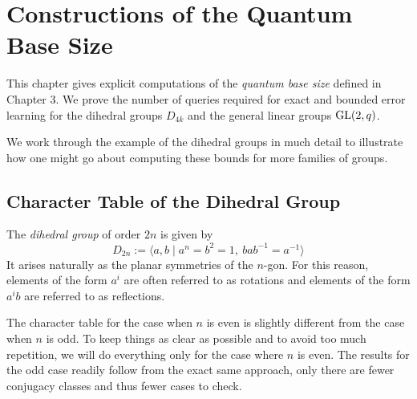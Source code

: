 

\chapter{Constructions of the Quantum Base Size}

This chapter gives explicit computations of the \emph{quantum base size} defined in Chapter 3. We prove the number 
of queries required for exact and bounded error learning for the dihedral groups $D_{4k}$ and the general linear 
groups $\operatorname{GL}(2, q)$.

We work through the example of the dihedral groups in much detail to illustrate how one might go about computing 
these bounds for more families of groups.





\section{Character Table of the Dihedral Group}

The \emph{dihedral group} of order $2n$ is given by
\[
    D_{2n} := \langle a,b \mid a^n = b^2 = 1,\ bab^{-1} = a^{-1} \rangle
\]
It arises naturally as the planar symmetries of the $n$-gon. For this reason, elements of the form $a^i$ are often 
referred to as rotations and elements of the form $a^ib$ are referred to as reflections.

The character table for the case when $n$ is even is slightly different from the case when $n$ is odd. To keep 
things as clear as possible and to avoid too much repetition, we will do everything only for the case where $n$ is 
even. The results for the odd case readily follow from the exact same approach, only there are fewer conjugacy 
classes and thus fewer cases to check.








